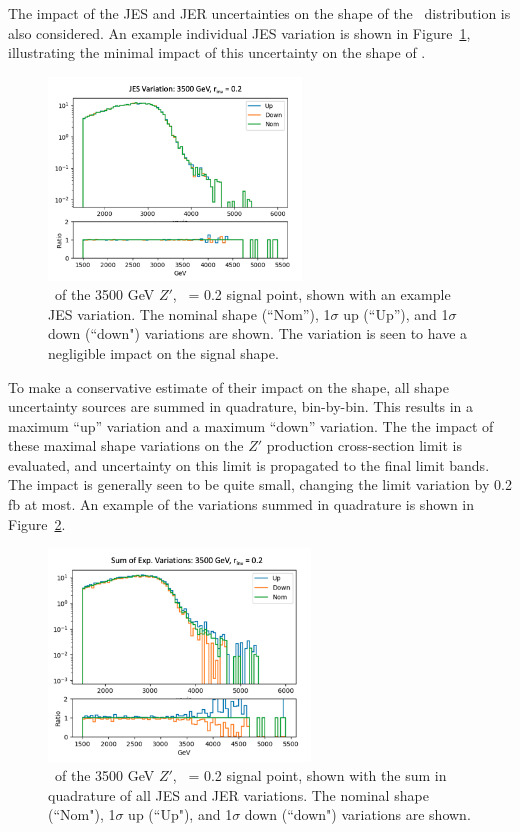 The impact of the JES and JER uncertainties on the shape of the \mt~distribution is also considered.
An example individual JES variation is shown in Figure~\ref{fig:jes_uncert}, illustrating the minimal impact of this uncertainty on the shape of \mt.
\begin{figure}[!htbp]
\centering
   \includegraphics[width=0.6\textwidth]{figures/results/jes}
    \caption{\mt~of the 3500 GeV $Z'$, \rinv~= 0.2 signal point, shown with an example JES variation. The nominal shape (``Nom''), 1$\sigma$ up (``Up''), and 1$\sigma$ down (``down") variations are shown. The variation is seen to have a negligible impact on the signal shape.
    \label{fig:jes_uncert}}
\end{figure}

To make a conservative estimate of their impact on the shape, all shape uncertainty sources are summed in quadrature, bin-by-bin.
This results in a maximum ``up'' variation and a maximum ``down'' variation.
The the impact of these maximal shape variations on the $Z'$ production cross-section limit is evaluated, and uncertainty on this limit is propagated to the final limit bands. 
The impact is generally seen to be quite small, changing the limit variation by 0.2 fb at most. 
An example of the variations summed in quadrature is shown in Figure~\ref{fig:jetcp_sumq}. 
\begin{figure}[!htbp]
\centering
   \includegraphics[width=0.62\textwidth]{figures/results/jetcp_sumq}
    \caption{\mt~of the 3500 GeV $Z'$, \rinv~= 0.2 signal point, shown with the sum in quadrature of all JES and JER variations. The nominal shape (``Nom"), 1$\sigma$ up (``Up"), and 1$\sigma$ down (``down") variations are shown.
    \label{fig:jetcp_sumq}}
\end{figure}

